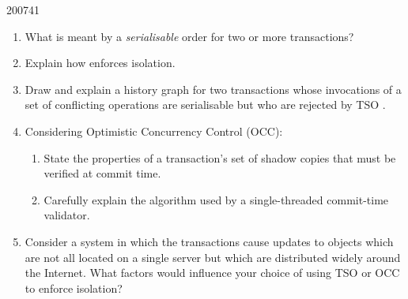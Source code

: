 \documentclass[10pt,\jkfside,a4paper]{article}
\begin{document}
\begin{examquestion}{2007}{4}{1}

\begin{enumerate}[label=(\alph*)]

\item What is meant by a \textit{serialisable} order for two or more
transactions?


\item Explain how  enforces isolation.


\item Draw and explain a history graph for two transactions whose invocations
of a set of conflicting operations are serialisable but who are rejected by
TSO .


\item Considering Optimistic Concurrency Control (OCC):

\begin{enumerate}[label=(\roman*)]

\item State the properties of a transaction's set of shadow copies that must
be verified at commit time.


\item Carefully explain the algorithm used by a single-threaded commit-time
validator.


\end{enumerate}

\item Consider a system in which the transactions cause updates to objects
which are not all located on a single server but which are distributed
widely around the Internet. What factors would influence your choice of
using TSO or OCC to enforce isolation?


\end{enumerate}

\end{examquestion}
\end{document}
